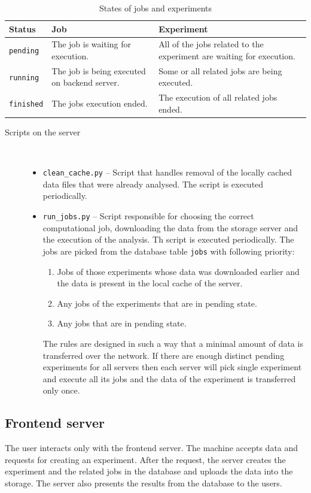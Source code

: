 \documentclass[
	digital,    %
	oneside,    %
	color,
	11pt,
	nocover,
	notable,
	nolof,
	nolot,
]{fithesis3}
\newenvironment{titlemize}[1]
{
	\begin{description}
	\item[#1]\
	\begin{itemize}
}
{
	\end{itemize}
 	\end{description}
}
\theoremstyle{definition}
\theoremstyle{remark}
\begin{document}
\begin{table}[H]
\begin{nomar}
\centering
\begin{tabular}{@{}lp{5cm}p{5cm}@{}} \toprule
\textbf{Status}   & \textbf{Job} & \textbf{Experiment} \\ \midrule
\texttt{pending}  & The job is waiting for execution. & All of the jobs related to the experiment are waiting for execution. \\ 
\texttt{running}  & The job is being executed on backend server. & Some or all related jobs are being executed. \\ 
\texttt{finished} & The jobs execution ended. & The execution of all \newline related jobs ended. \\ \bottomrule
\end{tabular}
\end{nomar}
\caption{States of jobs and experiments}
\label{tab:states_jobs_exps}
\end{table}

\begin{titlemize}{Scripts on the server}
\item \texttt{clean\_cache.py} -- Script that handles removal of the locally cached data files that were already analysed. The script is executed periodically.
\item \texttt{run\_jobs.py} -- Script responsible for choosing the correct computational job, downloading the data from the storage server and the execution of the analysis. Th script is executed periodically. The jobs are picked from the database table \texttt{jobs} with following priority:
\begin{enumerate}
\item Jobs of those experiments whose data was downloaded earlier and the data is present in the local cache of the server.
\item Any jobs of the experiments that are in pending state.
\item Any jobs that are in pending state.
\end{enumerate}
The rules are designed in such a way that a minimal amount of data is transferred over the network. If there are enough distinct pending experiments for all servers then each server will pick single experiment and execute all its jobs and the data of the experiment is transferred only once.
\end{titlemize}

\subsection{Frontend server}
The user interacts only with the frontend server. The machine accepts data and requests for creating an experiment. After the request, the server creates the experiment and the related jobs in the database and uploads the data into the storage. The server also presents the results from the database to the users.
\end{document}
